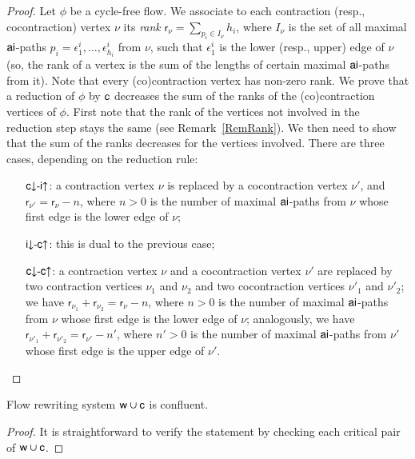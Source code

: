 \newcommand{\rk}{{\mathsf r}}
\begin{proof}
Let $\phi$ be a cycle-free flow. We associate to each contraction (resp., cocontraction) vertex $\nu$ its \emph{rank} $\rk_\nu=\sum_{p_i\in I_\nu}h_i$, where $I_\nu$ is the set of all maximal ${\mathsf{ai}}$-paths $p_i=\epsilon^i_1,\dots,\epsilon^i_{h_i}$ from $\nu$, such that $\epsilon^i_1$ is the lower (resp., upper) edge of $\nu$ (so, the rank of a vertex is the sum of the lengths of certain maximal ${\mathsf{ai}}$-paths from it). Note that every (co)contraction vertex has non-zero rank. We prove that a reduction of $\phi$ by ${\mathsf c}$ decreases the sum of the ranks of the (co)contraction vertices of $\phi$. First note that the rank of the vertices not involved in the reduction step stays the same (see Remark~\ref{RemRank}). We then need to show that the sum of the ranks decreases for the vertices involved. There are three cases, depending on the reduction rule:
\begin{itemize}
%
\item[${{\mathsf c}{\downarrow}{\hbox{-}}{\mathsf i}{\uparrow }}$:]a contraction vertex $\nu$ is replaced by a cocontraction vertex $\nu'$, and $\rk_{\nu'}=\rk_\nu-n$, where $n>0$ is the number of maximal ${\mathsf{ai}}$-paths from $\nu$ whose first edge is the lower edge of $\nu$;
%
\item[${{\mathsf i}{\downarrow}{\hbox{-}}{\mathsf c}{\uparrow }}$:]this is dual to the previous case;
%
\item[${{\mathsf c}{\downarrow}{\hbox{-}}{\mathsf c}{\uparrow }}$:]a contraction vertex $\nu$ and a cocontraction vertex $\nu'$ are replaced by two contraction vertices $\nu_1$ and $\nu_2$ and two cocontraction vertices $\nu'_1$ and $\nu'_2$; we have $\rk_{\nu_1}+\rk_{\nu_2}=\rk_\nu-n$, where $n>0$ is the number of maximal ${\mathsf{ai}}$-paths from $\nu$ whose first edge is the lower edge of $\nu$; analogously, we have $\rk_{\nu'_1}+\rk_{\nu'_2}=\rk_{\nu'}-n'$, where $n'>0$ is the number of maximal ${\mathsf{ai}}$-paths from $\nu'$ whose first edge is the upper edge of $\nu'$.
\end{itemize}
\end{proof}

\begin{theorem}\label{theorem:RewritingSystemContractionWeakeningConfluent}
Flow rewriting system\/ ${\mathsf w}\cup{\mathsf c}$ is confluent.
\end{theorem}

\begin{proof}
It is straightforward to verify the statement by checking each critical pair of ${\mathsf w}\cup{\mathsf c}$.
\end{proof}

